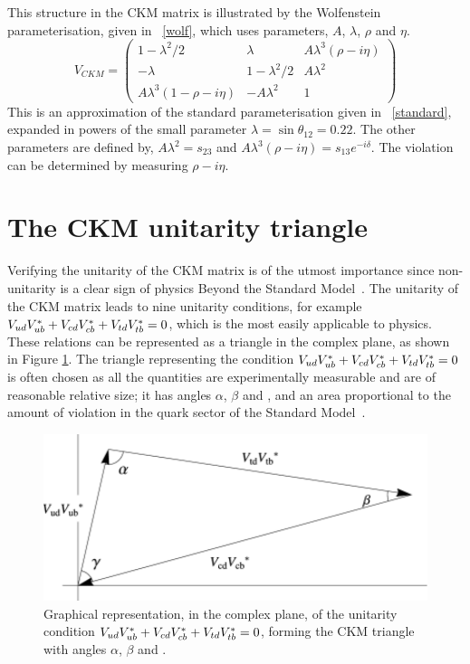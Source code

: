 This structure in the CKM matrix is illustrated by the Wolfenstein parameterisation, given in \eqn~\ref{wolf}, which uses parameters, $A$, $\lambda$, $\rho$ and $\eta$. 
\begin{equation}
V_{CKM} = \begin{pmatrix} 1 - \lambda^2/2 & \lambda & A\lambda^3(\rho - i\eta) \\ 
-\lambda & 1 - \lambda^2/2 & A\lambda^2 \\ 
A\lambda^3(1 - \rho - i\eta) & -A\lambda^2 & 1 \end{pmatrix}
\label{wolf}
\end{equation} 
This is an approximation of the standard parameterisation given in \eqn~\ref{standard}, expanded in powers of the small parameter $\lambda = \sin\theta_{12} = 0.22$. The other parameters are defined by, $A\lambda^2 = s_{23}$ and $A\lambda^3(\rho - i\eta) = s_{13}e^{-i\delta}$. The \CP violation can be determined by measuring $\rho - i\eta$.

\section{The CKM unitarity triangle}

Verifying the unitarity of the CKM matrix is of the utmost importance since non-unitarity is a clear sign of physics Beyond the Standard Model~\cite{CKMtriangle}. The unitarity of the CKM matrix leads to nine unitarity conditions, for example ${V_{{u}{d}}}{V_{{u}{b}}^\ast} + {V_{{c}{d}}}{V_{{c}{b}}^\ast} + {V_{{t}{d}}}{V_{{t}{b}}^\ast} = 0$, which is the most easily applicable to \B physics. These relations can be represented as a triangle in the complex plane, as shown in Figure \ref{triangle}. The triangle representing the condition ${V_{{u}{d}}}{V_{{u}{b}}^\ast} + {V_{{c}{d}}}{V_{{c}{b}}^\ast} + {V_{{t}{d}}}{V_{{t}{b}}^\ast} = 0$ is often chosen as all the quantities are experimentally measurable and are of reasonable relative size; it has angles $\alpha$, $\beta$ and \Pgamma, and an area proportional to the amount of \CP violation in the quark sector of the Standard Model~\cite{CKMtriangle}. 
\begin{figure}
\centering
\includegraphics[width=0.6\linewidth]{figures/theory/triangle.pdf}
\caption{Graphical representation, in the complex plane, of the unitarity condition ${V_{{u}{d}}}{V_{{u}{b}}^\ast} + {V_{{c}{d}}}{V_{{c}{b}}^\ast} + {V_{{t}{d}}}{V_{{t}{b}}^\ast} = 0$, forming the CKM triangle with angles $\alpha$, $\beta$ and \Pgamma.}
\label{triangle}
\end{figure}

